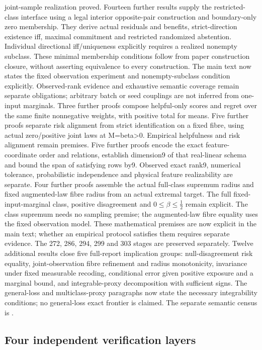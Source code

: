 joint-sample realization proved. Fourteen further results supply the restricted-class
interface using a legal interior opposite-pair construction and boundary-only zero membership.
They derive actual residuals and benefits, strict-direction existence iff, maximal commitment
and restricted randomized abstention. Individual directional iff/uniqueness explicitly requires
a realized nonempty subclass. These minimal membership conditions follow from paper construction
closure, without asserting equivalence to every construction. The main text now states the fixed
observation experiment and nonempty-subclass condition explicitly. Observed-rank evidence and
exhaustive semantic coverage remain separate obligations; arbitrary batch or
seed couplings are not inferred from one-input marginals. Three further proofs compose helpful-only
scores and regret over the same finite nonnegative weights, with positive total for means. Five
further proofs separate risk alignment from strict identification on a fixed fibre, using actual
zero/positive joint laws at M=beta>0. Empirical helpfulness and risk alignment remain premises.
Five further proofs encode the exact feature-coordinate order and relations, establish dimension9
of that real-linear schema and bound the span of satisfying rows by9. Observed exact rank9,
numerical tolerance, probabilistic independence and physical feature realizability are separate.
Four further proofs assemble the actual full-class supremum radius and fixed augmented-law fibre
radius from an actual extremal target. The full fixed-input-marginal class, positive disagreement
and $0\le\beta\le\tfrac12$ remain explicit. The class supremum needs no sampling premise; the
augmented-law fibre equality uses the fixed observation model. These mathematical premises are
now explicit in the main text; whether an empirical protocol satisfies them requires separate
evidence. The 272, 286, 294, 299 and 303 stages are preserved separately.
Twelve additional results close five full-report implication groups: null-disagreement
risk equality, joint-observation fibre refinement and radius monotonicity, invariance
under fixed measurable recoding, conditional error given positive exposure and a
marginal bound, and integrable-proxy decomposition with sufficient signs.
The general-loss and multiclass-proxy paragraphs now state the necessary integrability
conditions; no general-loss exact frontier is claimed. The separate semantic census is
.

\subsection{Four independent verification layers}
\label{fr:four-verification-layers}

